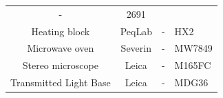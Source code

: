 \documentclass[11pt,singlespacinge,twoside]{reedthesis} %
\begin{document}
\begin{longtable}[]{@{}cccl@{}}
\begin{minipage}[t]{0.42\columnwidth}
-\strut
\end{minipage} & \begin{minipage}[t]{0.11\columnwidth}\raggedright
2691\strut
\end{minipage}\tabularnewline
\begin{minipage}[t]{0.26\columnwidth}\centering
Heating block\strut
\end{minipage} & \begin{minipage}[t]{0.10\columnwidth}\centering
PeqLab\strut
\end{minipage} & \begin{minipage}[t]{0.42\columnwidth}\centering
-\strut
\end{minipage} & \begin{minipage}[t]{0.11\columnwidth}\raggedright
HX2\strut
\end{minipage}\tabularnewline
\begin{minipage}[t]{0.26\columnwidth}\centering
Microwave oven\strut
\end{minipage} & \begin{minipage}[t]{0.10\columnwidth}\centering
Severin\strut
\end{minipage} & \begin{minipage}[t]{0.42\columnwidth}\centering
-\strut
\end{minipage} & \begin{minipage}[t]{0.11\columnwidth}\raggedright
MW7849\strut
\end{minipage}\tabularnewline
\begin{minipage}[t]{0.26\columnwidth}\centering
Stereo microscope\strut
\end{minipage} & \begin{minipage}[t]{0.10\columnwidth}\centering
Leica\strut
\end{minipage} & \begin{minipage}[t]{0.42\columnwidth}\centering
-\strut
\end{minipage} & \begin{minipage}[t]{0.11\columnwidth}\raggedright
M165FC\strut
\end{minipage}\tabularnewline
\begin{minipage}[t]{0.26\columnwidth}\centering
Transmitted Light Base\strut
\end{minipage} & \begin{minipage}[t]{0.10\columnwidth}\centering
Leica\strut
\end{minipage} & \begin{minipage}[t]{0.42\columnwidth}\centering
-\strut
\end{minipage} & \begin{minipage}[t]{0.11\columnwidth}\raggedright
MDG36\strut
\end{minipage}\tabularnewline
\bottomrule
\end{longtable}
\end{document}
